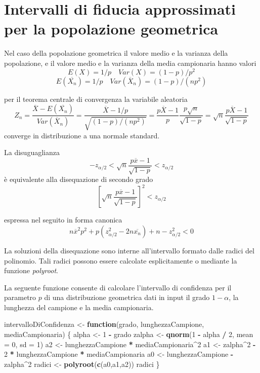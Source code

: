 \documentclass[]{book}
\newenvironment{Shaded}{\begin{snugshade}}{\end{snugshade}}
\newcommand{\KeywordTok}[1]{\textcolor[rgb]{0.13,0.29,0.53}{\textbf{#1}}}
\newcommand{\DataTypeTok}[1]{\textcolor[rgb]{0.13,0.29,0.53}{#1}}
\newcommand{\DecValTok}[1]{\textcolor[rgb]{0.00,0.00,0.81}{#1}}
\newcommand{\StringTok}[1]{\textcolor[rgb]{0.31,0.60,0.02}{#1}}
\newcommand{\ControlFlowTok}[1]{\textcolor[rgb]{0.13,0.29,0.53}{\textbf{#1}}}
\newcommand{\OperatorTok}[1]{\textcolor[rgb]{0.81,0.36,0.00}{\textbf{#1}}}
\newcommand{\NormalTok}[1]{#1}
\begin{document}
\section{Intervalli di fiducia approssimati per la popolazione
geometrica}\label{intervalli-di-fiducia-approssimati-per-la-popolazione-geometrica}

Nel caso della popolazione geometrica il valore medio e la varianza
della popolazione, e il valore medio e la varianza della media
campionaria hanno valori \[E(X) = 1/p  \quad Var(X) = (1-p) / p^2\]
\[E(\overline{X_n}) = 1/p \quad Var(\overline X_n) = (1-p) / (n p^2)\]

per il teorema centrale di convergenza la variabile aleatoria
\[Z_n = \frac{\overline X - E(\overline{X_n})}{Var(\overline X_n)} = \frac{\overline{X} - 1/p}{\sqrt{(1-p) / (n p^2)}} = \frac{p\overline{X} -1}{p} \frac{p\sqrt{n}}{\sqrt{1-p}} = \sqrt{n} \frac{p\overline{X} -1}{\sqrt{1-p}}\]
converge in distribuzione a una normale standard.

La disuguaglianza
\[-z_{\alpha/2} < \sqrt{n} \frac{p\overline{x} -1}{\sqrt{1-p}} < z_{\alpha/2}\]
è equivalente alla disequazione di secondo grado
\[ \left[ \sqrt{n} \frac{p\overline{x} -1}{\sqrt{1-p}} \right]^2 < z_{\alpha/2}\]

espressa nel seguito in forma canonica
\[n\overline{x}^2 p^2 +p(z_{\alpha/2}^2 -2n\overline{x_n}) + n -z_{\alpha/2}^2 < 0\]

La soluzioni della disequazione sono interne all'intervallo formato
dalle radici del polinomio. Tali radici possono essere calcolate
esplicitamente o mediante la funzione \emph{polyroot}.

La seguente funzione consente di calcolare l'intervallo di confidenza
per il parametro \(p\) di una distribuzione geometrica dati in input il
grado \(1-\alpha\), la lunghezza del campione e la media campionaria.

\begin{Shaded}
\begin{Highlighting}[]
\NormalTok{intervalloDiConfidenza <-}\StringTok{ }\ControlFlowTok{function}\NormalTok{(grado, lunghezzaCampione, mediaCampionaria) \{}
\NormalTok{  alpha <-}\StringTok{ }\DecValTok{1} \OperatorTok{-}\StringTok{ }\NormalTok{grado}
\NormalTok{  zalpha <-}\StringTok{ }\KeywordTok{qnorm}\NormalTok{(}\DecValTok{1} \OperatorTok{-}\StringTok{ }\NormalTok{alpha }\OperatorTok{/}\StringTok{ }\DecValTok{2}\NormalTok{, }\DataTypeTok{mean =} \DecValTok{0}\NormalTok{, }\DataTypeTok{sd =} \DecValTok{1}\NormalTok{)}
\NormalTok{  a2 <-}\StringTok{ }\NormalTok{lunghezzaCampione }\OperatorTok{*}\StringTok{ }\NormalTok{mediaCampionaria}\OperatorTok{^}\DecValTok{2}
\NormalTok{  a1 <-}\StringTok{ }\NormalTok{zalpha}\OperatorTok{^}\DecValTok{2} \OperatorTok{-}\StringTok{ }\DecValTok{2} \OperatorTok{*}\StringTok{ }\NormalTok{lunghezzaCampione }\OperatorTok{*}\StringTok{ }\NormalTok{mediaCampionaria}
\NormalTok{  a0 <-}\StringTok{ }\NormalTok{lunghezzaCampione }\OperatorTok{-}\StringTok{ }\NormalTok{zalpha}\OperatorTok{^}\DecValTok{2}
\NormalTok{  radici <-}\StringTok{ }\KeywordTok{polyroot}\NormalTok{(}\KeywordTok{c}\NormalTok{(a0,a1,a2))}
\NormalTok{  radici}
\NormalTok{\}}
\end{Highlighting}
\end{Shaded}
\end{document}
